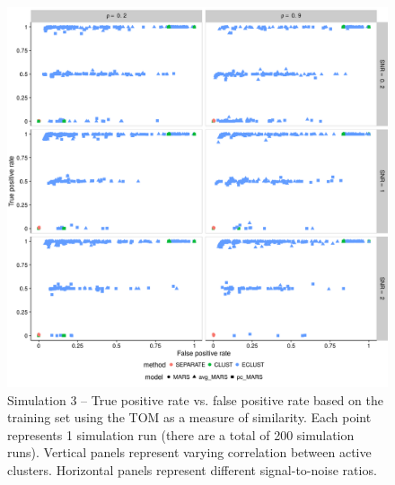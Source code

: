 \begin{appendices}
\begin{figure}
	\includegraphics[scale=0.6, keepaspectratio]{./figs/hydra/results/figures/sim3-sept27/tpr_fpr_TOM_sim3.png}
	\caption{Simulation 3 -- True positive rate vs. false positive rate based on the training set using the TOM as a measure of similarity. Each point represents 1 simulation run (there are a total of 200 simulation runs). Vertical panels represent varying correlation between active clusters. Horizontal panels represent different signal-to-noise ratios.}
	\label{fig:tpr_fpr_TOM_sim3}
\end{figure}



\end{appendices}
